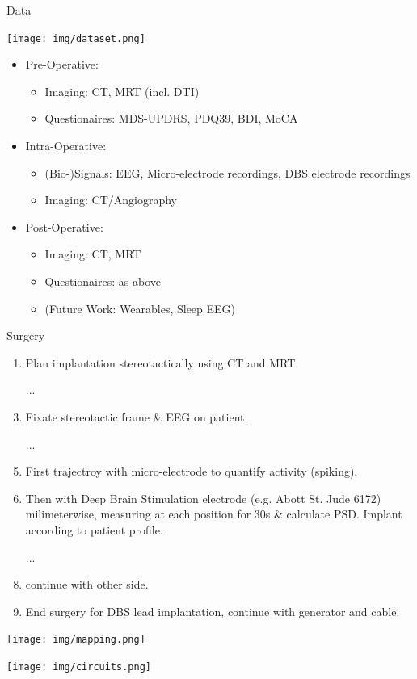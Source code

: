 \documentclass[10pt]{beamer}
\begin{document}
\begin{frame}{Data}
   \begin{center}
    \texttt{[image: img/dataset.png]}
    \end{center}
\framebreak
  \begin{itemize}
   \item Pre-Operative:
   \begin{itemize}
    \item Imaging: CT, MRT (incl. DTI)
    \item Questionaires: MDS-UPDRS, PDQ39, BDI, MoCA
   \end{itemize}
   \item Intra-Operative:
      \begin{itemize}
       \item (Bio-)Signals: EEG, Micro-electrode recordings, DBS electrode recordings
       \item Imaging: CT/Angiography
      \end{itemize}

   \item Post-Operative:
      \begin{itemize}
        \item Imaging: CT, MRT
        \item Questionaires: as above
        \item (Future Work: Wearables, Sleep EEG)
      \end{itemize}
  \end{itemize}
\end{frame}

\begin{frame}{Surgery}
  \begin{enumerate}
   \item Plan implantation stereotactically using CT and MRT.
   \item [...]
   \item Fixate stereotactic frame \& EEG on patient.
   \item [...]
   \item First trajectroy with micro-electrode to quantify activity (spiking).
   \item Then with Deep Brain Stimulation electrode (e.g. Abott St. Jude 6172) milimeterwise, measuring at each position for 30s \& calculate PSD. Implant according to patient profile.
   \item [...]
   \item continue with other side.
   \item End surgery for DBS lead implantation, continue with generator and cable.
  \end{enumerate}
  \framebreak
  \begin{center}
   \texttt{[image: img/mapping.png]}
  \end{center}
  \begin{center}
   \texttt{[image: img/circuits.png]}
  \end{center}
\end{frame}
\end{document}
